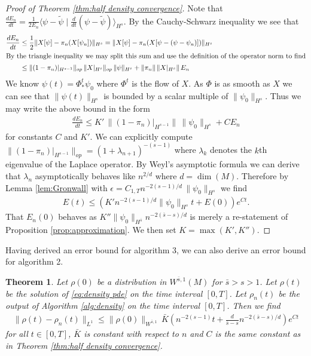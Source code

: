 \documentclass[final,leqno]{siamltex1213}
\newtheorem{thm}{Theorem}[section]
\begin{document}
\begin{proof}[Proof of Theorem \ref{thm:half density convergence}]
	Note that $\frac{dE_{n}}{dt} = \frac{1}{2E_{n}} \langle  \psi - \tilde{\psi} \mid \frac{d}{dt} ( \psi -\tilde{\psi} )\rangle_{H^{s}}$.
	By the Cauchy-Schwarz inequality we see that
	\begin{align}
		\frac{dE_{n}}{dt} &\leq  \frac{1}{2} \| X[\psi] - \pi_{n}(X[\psi_{n}]) \|_{H^{s}} = \| X[\psi] - \pi_{n}( X[\psi- (\psi-\psi_{n})]) \|_{H^{s}} \\
	\intertext{By the triangle inequality we may split this sum and use the definition of the operator norm to find}
		&\leq \| (1-\pi_{n})|_{H^{s-1}} \|_{op} \, \|X|_{H^{s}} \|_{op} \, \| \psi \|_{H^{s}} + \| \pi_{n} \| \, \|X|_{H^{s}} \| \, E_{n} \\
	\end{align}
	We know $\psi(t) = \Phi^{t}_{*}\psi_{0}$ where $\Phi^{t}$ is the flow of $X$.
	As $\Phi$ is as smooth as $X$ we can see that $\| \psi(t) \|_{H^{s}}$ is bounded by a scalar multiple of $\| \psi_{0} \|_{H^{s}}$.
	Thus we may write the above bound in the form
	\begin{align}
		\frac{dE_{n}}{dt} \leq K' \, \| (1- \pi_{n})|_{H^{s-1}} \| \, \| \psi_{0}\|_{H^{s}}+ C E_{n}
	\end{align}
	for constants $C$ and $K'$.
	We can explicitly compute $\| (1-\pi_{n})|_{H^{s-1}} \|_{op} = (1+\lambda_{n+1})^{-(s-1)}$ where $\lambda_{k}$ denotes the $k$th eigenvalue of the Laplace operator.
	By Weyl's asymptotic formula \cite[Theorem B.2]{Chavel1984} we
	can derive that $\lambda_{n}$ asymptotically behaves like $n^{2/d}$ where $d = \dim(M)$.
	Therefore by Lemma \ref{lem:Gronwall} with $\epsilon = C_{1,T} n^{-2(s-1) / d} \, \| \psi_{0}\|_{H^{s}}$
	we find
	\begin{align}
		E(t) \leq ( K' n^{-2(s-1) / d} \| \psi_{0} \|_{H^{s}} t+  E(0) ) e^{C t}.
	\end{align}
	That $E_{n}(0)$ behaves as $K'' \| \psi_{0} \|_{H^{\bar{s}}} n^{-2(\bar{s}-s)/d}$ is merely a re-statement of Proposition \ref{prop:approximation}.
	We then set $K = \max(K', K'')$.
\end{proof}

Having derived an error bound for algorithm 3, we can also derive an error bound for algorithm 2.

\begin{thm} \label{thm:density convergence}
	Let $\rho(0)$ be a distribution in $W^{\bar{s},1}(M)$ for $\bar{s} > s >1$.
	Let $\rho(t)$ be the solution of \eqref{eq:density pde} on the time interval $[0,T]$.
	Let $\rho_{n}(t)$ be the output of Algorithm \ref{alg:density} on the time interval $[0,T]$.
	Then we find
	\begin{align}
		\| \rho(t) - \rho_{n}(t) \|_{L^{1}} \leq \| \rho(0) \|_{W^{\bar{s},1}} \, \bar{K} \left( n^{-2(s-1)} t+  \frac{d}{\bar{s}-s} n^{-2(\bar{s}-s)/d} \right) e^{C t}
	\end{align}
	for all $t \in [0,T]$, $\bar{K}$ is constant with respect to $n$ and $C$ is the same constant as in Theorem \ref{thm:half density convergence}.
\end{thm}
\end{document}
